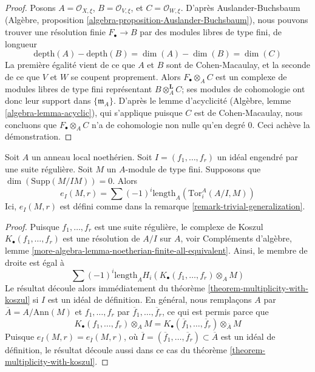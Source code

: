 \begin{proof}
Posons $A = \mathcal{O}_{X, \xi}$, $B = \mathcal{O}_{V, \xi}$, et
$C = \mathcal{O}_{W, \xi}$. D'après Auslander-Buchsbaum
(Algèbre, proposition \ref{algebra-proposition-Auslander-Buchsbaum}),
nous pouvons trouver une résolution finie $F_\bullet \to B$ par des modules libres
de type fini, de longueur
$$
\text{depth}(A) - \text{depth}(B) =
\dim(A) - \dim(B) = \dim(C)
$$
La première égalité vient de ce que $A$ et $B$ sont de Cohen-Macaulay, et la seconde
de ce que $V$ et $W$ se coupent proprement. Alors $F_\bullet \otimes_A C$ est un
complexe de modules libres de type fini représentant $B \otimes_A^\mathbf{L} C$;
ses modules de cohomologie ont donc leur support dans $\{\mathfrak m_A\}$.
D'après le lemme d'acyclicité (Algèbre, lemme \ref{algebra-lemma-acyclic}),
qui s'applique puisque $C$ est de Cohen-Macaulay,
nous concluons que $F_\bullet \otimes_A C$ n'a de
cohomologie non nulle qu'en degré $0$. Ceci achève la démonstration.
\end{proof}

\begin{lemma}
\label{lemma-one-ideal-ci}
Soit $A$ un anneau local noethérien. Soit $I = (f_1, \ldots, f_r)$ un idéal
engendré par une suite régulière. Soit $M$ un $A$-module de type fini. Supposons que
$\dim(\text{Supp}(M/IM)) = 0$. Alors
$$
e_I(M, r) = \sum (-1)^i\text{length}_A(\text{Tor}_i^A(A/I, M))
$$
Ici, $e_I(M, r)$ est défini comme dans la remarque \ref{remark-trivial-generalization}.
\end{lemma}

\begin{proof}
Puisque $f_1, \ldots, f_r$ est une suite régulière, le complexe de Koszul
$K_\bullet(f_1, \ldots, f_r)$ est une résolution de $A/I$ sur $A$, voir
Compléments d'algèbre, lemme
\ref{more-algebra-lemma-noetherian-finite-all-equivalent}.
Ainsi, le membre de droite est égal à
$$
\sum (-1)^i\text{length}_A H_i(K_\bullet(f_1, \ldots, f_r) \otimes_A M)
$$
Le résultat découle alors immédiatement du
théorème \ref{theorem-multiplicity-with-koszul} si $I$ est un idéal
de définition. En général, nous remplaçons $A$ par $\overline{A} = A/\text{Ann}(M)$
et $f_1, \ldots, f_r$ par $\overline{f}_1, \ldots, \overline{f}_r$,
ce qui est permis parce que
$$
K_\bullet(f_1, \ldots, f_r) \otimes_A M =
K_\bullet(\overline{f}_1, \ldots, \overline{f}_r) \otimes_{\overline{A}} M
$$
Puisque $e_I(M, r) = e_{\overline{I}}(M, r)$, où
$\overline{I} = (\overline{f}_1, \ldots, \overline{f}_r) \subset \overline{A}$
est un idéal de définition, le résultat découle aussi dans ce cas du
théorème \ref{theorem-multiplicity-with-koszul}.
\end{proof}

